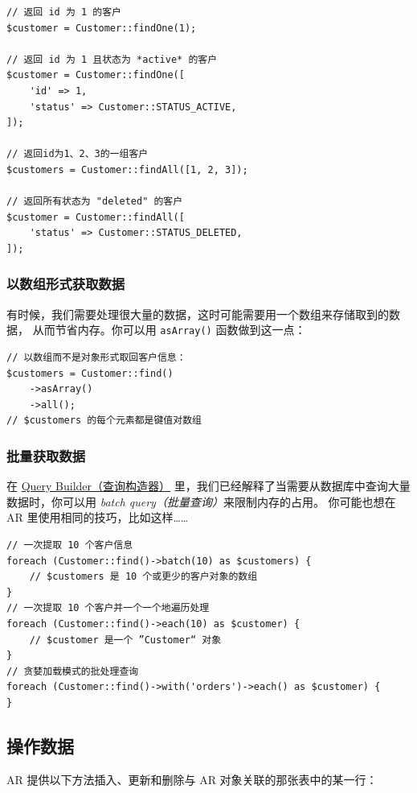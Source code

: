 \lstset{language=php}\begin{lstlisting}
// 返回 id 为 1 的客户
$customer = Customer::findOne(1);

// 返回 id 为 1 且状态为 *active* 的客户
$customer = Customer::findOne([
    'id' => 1,
    'status' => Customer::STATUS_ACTIVE,
]);

// 返回id为1、2、3的一组客户
$customers = Customer::findAll([1, 2, 3]);

// 返回所有状态为 "deleted" 的客户
$customer = Customer::findAll([
    'status' => Customer::STATUS_DELETED,
]);
\end{lstlisting}
\subsubsection{以数组形式获取数据}
有时候，我们需要处理很大量的数据，这时可能需要用一个数组来存储取到的数据，
从而节省内存。你可以用 \lstinline|asArray()| 函数做到这一点：

\lstset{language=php}\begin{lstlisting}
// 以数组而不是对象形式取回客户信息：
$customers = Customer::find()
    ->asArray()
    ->all();
// $customers 的每个元素都是键值对数组
\end{lstlisting}
\subsubsection{批量获取数据}
在 \hyperref[query-builder.md]{Query Builder（查询构造器）} 里，我们已经解释了当需要从数据库中查询大量数据时，你可以用 \textit{batch query（批量查询）}来限制内存的占用。
你可能也想在 AR 里使用相同的技巧，比如这样……

\lstset{language=php}\begin{lstlisting}
// 一次提取 10 个客户信息
foreach (Customer::find()->batch(10) as $customers) {
    // $customers 是 10 个或更少的客户对象的数组
}
// 一次提取 10 个客户并一个一个地遍历处理
foreach (Customer::find()->each(10) as $customer) {
    // $customer 是一个 ”Customer“ 对象
}
// 贪婪加载模式的批处理查询
foreach (Customer::find()->with('orders')->each() as $customer) {
}
\end{lstlisting}
\subsection{操作数据}
AR 提供以下方法插入、更新和删除与 AR 对象关联的那张表中的某一行：


